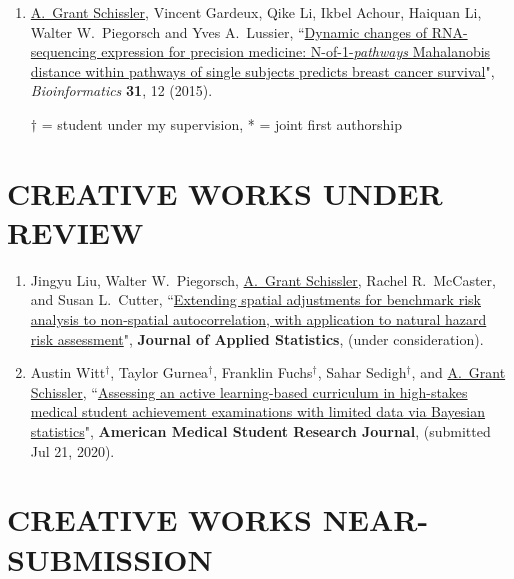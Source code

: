 \documentclass[paper=a4,fontsize=11pt]{scrartcl} %
\newcommand{\NewPart}[2]{\section*{\uppercase{#1} #2 }}
\newcommand{\PaperEntry}[7]{
		\noindent #1, ``\href{#7}{#2}", \textit{#3} \textbf{#4}, #5 (#6).}
\begin{document}
\begin{enumerate}
\item \PaperEntry{\underline{A.~Grant Schissler}, Vincent Gardeux, Qike Li, Ikbel Achour, Haiquan Li, Walter W.~Piegorsch and Yves A.~Lussier}{Dynamic changes of RNA-sequencing expression for precision medicine: N-of-1-\textit{pathways} Mahalanobis distance within pathways of single subjects predicts breast cancer survival}{Bioinformatics}{31}{12}{2015}{http://bioinformatics.oxfordjournals.org/content/31/12/i293.full}

  $\dagger$ = student under my supervision, * = joint first authorship
\end{enumerate}


\NewPart{Creative works under review}{}
\vspace{-7pt}
\begin{enumerate}

\item \PaperEntry{Jingyu Liu, Walter W.~Piegorsch, \underline{A.~Grant Schissler}, Rachel R.~McCaster, and Susan L.~Cutter}{Extending spatial adjustments for benchmark risk analysis to non-spatial autocorrelation, with application to natural hazard risk assessment}{}{Journal of Applied Statistics}{}{under consideration}{}

  \item \PaperEntry{Austin Witt$^{\dagger}$, Taylor Gurnea$^{\dagger}$, Franklin Fuchs$^{\dagger}$, Sahar Sedigh$^{\dagger}$, and \underline{A.~Grant Schissler}}{Assessing an active learning-based curriculum in high-stakes medical student achievement examinations with limited data via Bayesian statistics}{}{American Medical Student Research Journal}{}{submitted Jul 21, 2020}{}
  
\end{enumerate}

\NewPart{Creative works near-submission}{}
\vspace{-7pt}
\end{document}

